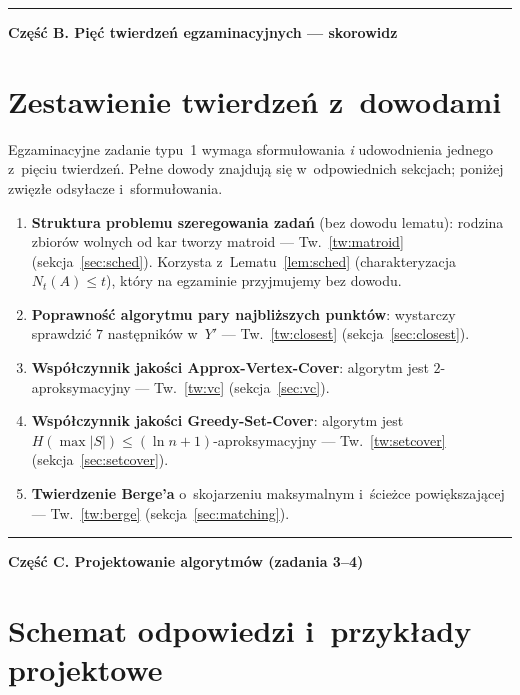 \documentclass[11pt,a4paper]{article}
\theoremstyle{plain}
\theoremstyle{definition}
\begin{document}
\bigskip
\hrule
\bigskip
\begin{center}\Large\textbf{Część B. Pięć twierdzeń egzaminacyjnych --- skorowidz}\end{center}
\section{Zestawienie twierdzeń z~dowodami}\label{sec:tw}
Egzaminacyjne zadanie typu~1 wymaga sformułowania \emph{i} udowodnienia jednego z~pięciu twierdzeń.
Pełne dowody znajdują się w~odpowiednich sekcjach; poniżej zwięzłe odsyłacze i~sformułowania.
\begin{enumerate}[label=\textbf{(\arabic*)},leftmargin=2.2em]
\item \textbf{Struktura problemu szeregowania zadań} (bez dowodu lematu): rodzina zbiorów wolnych od kar
tworzy matroid --- Tw.~\ref{tw:matroid} (sekcja~\ref{sec:sched}). Korzysta z~Lematu~\ref{lem:sched}
(charakteryzacja $N_t(A)\le t$), który na egzaminie przyjmujemy bez dowodu.
\item \textbf{Poprawność algorytmu pary najbliższych punktów}: wystarczy sprawdzić $7$ następników w~$Y'$ ---
Tw.~\ref{tw:closest} (sekcja~\ref{sec:closest}).
\item \textbf{Współczynnik jakości Approx-Vertex-Cover}: algorytm jest $2$-aproksymacyjny ---
Tw.~\ref{tw:vc} (sekcja~\ref{sec:vc}).
\item \textbf{Współczynnik jakości Greedy-Set-Cover}: algorytm jest $H(\max|S|)\le(\ln n+1)$-aproksymacyjny
--- Tw.~\ref{tw:setcover} (sekcja~\ref{sec:setcover}).
\item \textbf{Twierdzenie Berge'a} o~skojarzeniu maksymalnym i~ścieżce powiększającej ---
Tw.~\ref{tw:berge} (sekcja~\ref{sec:matching}).
\end{enumerate}

\bigskip
\hrule
\bigskip
\begin{center}\Large\textbf{Część C. Projektowanie algorytmów (zadania 3--4)}\end{center}
\section{Schemat odpowiedzi i~przykłady projektowe}\label{sec:projekt}
\end{document}
